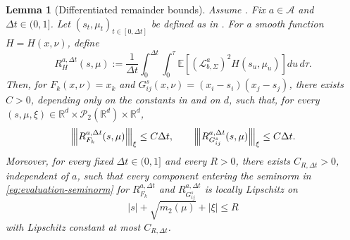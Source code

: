 \documentclass[a4paper, 10pt, english, reqno]{amsart}
\def\R{\mathbb R}
\newcommand{\tnorm}[1]{\left\vert\kern-0.25ex\left\vert\kern-0.25ex\left\vert #1
\right\vert\kern-0.25ex\right\vert\kern-0.25ex\right\vert}
\newtheorem{lemma}[theorem]{Lemma}
\begin{document}
\begin{lemma}[Differentiated remainder bounds]
\label{lem:differentiated-remainder-bounds-mkv}
Assume . Fix $a\in\mathcal A$ and
$\Delta t\in(0,1]$. Let $(s_t,\mu_t)_{t\in[0,\Delta t]}$ be defined as
in . For a smooth
function $H=H(x,\nu)$, define
\begin{equation}
\label{eq:RFk-definition-mkv}
R_H^{a,\Delta t}(s,\mu)
:=
\frac1{\Delta t}
\int_0^{\Delta t}\int_0^\tau
\mathbb E\!\left[
(\mathscr L_{b,\Sigma}^a)^2H(s_u,\mu_u)
\right]du\,d\tau .
\end{equation}
Then, for $F_k(x,\nu)=x_k$ and
$G_{ij}^s(x,\nu)=(x_i-s_i)(x_j-s_j)$, there exists $C>0$, depending
only on the constants in  and on $d$, such
that, for every $(s,\mu,\xi)\in\R^d\times\mathcal P_2(\R^d)\times\R^d$,
\begin{equation}
\label{eq:RFk-differentiated-bound-mkv}
\tnorm{R_{F_k}^{a,\Delta t}(s,\mu)}_{\xi}
\le
C\Delta t,
\qquad
\tnorm{R_{G_{ij}^s}^{a,\Delta t}(s,\mu)}_{\xi}
\le
C\Delta t .
\end{equation}
Moreover, for every fixed $\Delta t\in(0,1]$ and every $R>0$, there
exists $C_{R,\Delta t}>0$, independent of $a$, such that every component
entering the seminorm in \eqref{eq:evaluation-seminorm} for
$R_{F_k}^{a,\Delta t}$ and $R_{G_{ij}^s}^{a,\Delta t}$ is locally
Lipschitz on
\[
|s|+\sqrt{m_2(\mu)}+|\xi|\le R
\]
with Lipschitz constant at most $C_{R,\Delta t}$.

\end{lemma}
\end{document}

